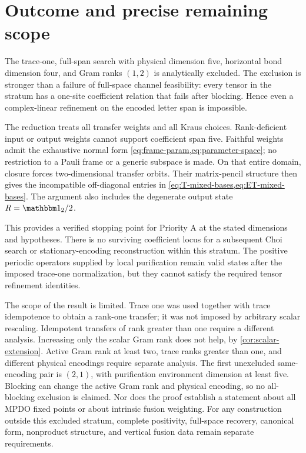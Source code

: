 \section{Outcome and precise remaining scope}
\label{sec:outcome}

The trace-one, full-span search with physical dimension five,
horizontal bond dimension four, and Gram ranks $(1,2)$ is
analytically excluded. The exclusion is stronger than a failure of
full-space channel feasibility: every tensor in the stratum has a
one-site coefficient relation that fails after blocking. Hence even
a complex-linear refinement on the encoded letter span is impossible.

The reduction treats all transfer weights and all Kraus choices.
Rank-deficient input or output weights cannot support coefficient
span five. Faithful weights admit the exhaustive normal form
\cref{eq:frame-param,eq:parameter-space}; no restriction to a Pauli
frame or a generic subspace is made. On that entire domain,
closure forces two-dimensional transfer orbits. Their matrix-pencil
structure then gives the incompatible off-diagonal entries in
\cref{eq:T-mixed-bases,eq:ET-mixed-bases}. The argument also includes
the degenerate output state $R=\Id_2/2$.

This provides a verified stopping point for Priority A at the stated
dimensions and hypotheses. There is no surviving coefficient locus
for a subsequent Choi search or stationary-encoding reconstruction
within this stratum. The positive periodic operators supplied by
local purification remain valid states after the imposed trace-one
normalization, but they cannot satisfy the required tensor refinement
identities.

The scope of the result is limited. Trace one was used together with
trace idempotence to obtain a rank-one transfer; it was not imposed
by arbitrary scalar rescaling. Idempotent transfers of rank greater
than one require a different analysis. Increasing only the scalar Gram rank does not help, by
\cref{cor:scalar-extension}. Active Gram rank at least two, trace ranks
greater than one, and different physical encodings require separate
analysis. The first unexcluded same-encoding pair is $(2,1)$, with
purification environment dimension at least five. Blocking can change
the active Gram rank and physical encoding, so no all-blocking exclusion
is claimed. Nor does the proof establish a statement about all MPDO
fixed points or about intrinsic fusion weighting.
For any construction outside this excluded stratum, complete
positivity, full-space recovery, canonical form, nonproduct structure,
and vertical fusion data remain separate requirements.
